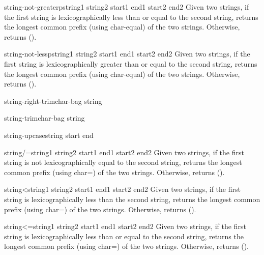 \begin{function}{string-not-greaterp}{string1 string2 \key start1 end1 start2 end2}{}{}
  Given two strings, if the first string is lexicographically less than
  or equal to the second string, returns the longest common prefix
  (using char-equal) of the two strings. Otherwise, returns ().
\end{function}

\begin{function}{string-not-lessp}{string1 string2 \key start1 end1 start2 end2}{}{}
  Given two strings, if the first string is lexicographically greater
  than or equal to the second string, returns the longest common prefix
  (using char-equal) of the two strings. Otherwise, returns ().
\end{function}

\begin{function}{string-right-trim}{char-bag string}{}{}
  
\end{function}

\begin{function}{string-trim}{char-bag string}{}{}
  
\end{function}

\begin{function}{string-upcase}{string \key start end}{}{}
  
\end{function}

\begin{function}{string/=}{string1 string2 \key start1 end1 start2 end2}{}{}
  Given two strings, if the first string is not lexicographically equal
  to the second string, returns the longest common prefix (using char=)
  of the two strings. Otherwise, returns ().
\end{function}

\begin{function}{string<}{string1 string2 \key start1 end1 start2 end2}{}{}
  Given two strings, if the first string is lexicographically less than
  the second string, returns the longest common prefix (using char=)
  of the two strings. Otherwise, returns ().
\end{function}

\begin{function}{string<=}{string1 string2 \key start1 end1 start2 end2}{}{}
  Given two strings, if the first string is lexicographically less than
  or equal to the second string, returns the longest common prefix
  (using char=) of the two strings. Otherwise, returns ().
\end{function}

